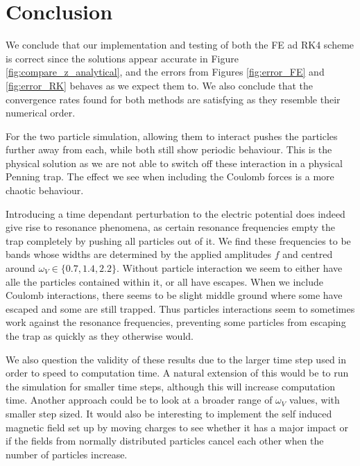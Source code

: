 \section{Conclusion}\label{sec:conclusion}

We conclude that our implementation and testing of both the FE ad RK4 scheme is correct since the solutions appear accurate in Figure \ref{fig:compare_z_analytical}, and the errors from Figures \ref{fig:error_FE} and \ref{fig:error_RK} behaves as we expect them to. We also conclude that the convergence rates found for both methods are satisfying as they resemble their numerical order. 


For the two particle simulation, allowing them to interact pushes the particles further away from each, while both still show periodic behaviour. This is the physical solution as we are not able to switch off these interaction in a physical Penning trap. The effect we see when including the Coulomb forces is a more chaotic behaviour. 

Introducing a time dependant perturbation to the electric potential does indeed give rise to resonance phenomena, as certain resonance frequencies empty the trap completely by pushing all particles out of it. We find these frequencies to be bands whose widths are determined by the applied amplitudes $f$ and centred around $\omega_V\in\{0.7, 1.4, 2.2\}$. Without particle interaction we seem to either have alle the particles contained within it, or all have escapes. When we include Coulomb interactions, there seems to be slight middle ground where some have escaped and some are still trapped. Thus particles interactions seem to sometimes work against the resonance frequencies, preventing some particles from escaping the trap as quickly as they otherwise would. 

We also question the validity of these results due to the larger time step used in order to speed to computation time. A natural extension of this would be to run the simulation for smaller time steps, although this will increase computation time. Another approach could be to look at a broader range of $\omega_V$ values, with smaller step sized. It would also be interesting to implement the self induced magnetic field set up by moving charges to see whether it has a major impact or if the fields from normally distributed particles cancel each other when the number of particles increase. 

